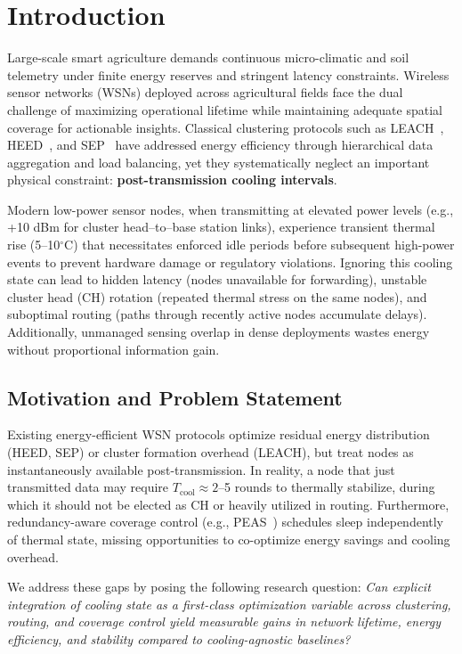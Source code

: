 \section{Introduction}
Large-scale smart agriculture demands continuous micro-climatic and soil telemetry under finite energy reserves and stringent latency constraints. Wireless sensor networks (WSNs) deployed across agricultural fields face the dual challenge of maximizing operational lifetime while maintaining adequate spatial coverage for actionable insights. Classical clustering protocols such as LEACH~\cite{heinzelman2000leach}, HEED~\cite{younis2004heed}, and SEP~\cite{smaragdakis2004sep} have addressed energy efficiency through hierarchical data aggregation and load balancing, yet they systematically neglect an important physical constraint: \textbf{post-transmission cooling intervals}.

Modern low-power sensor nodes, when transmitting at elevated power levels (e.g., +10 dBm for cluster head--to--base station links), experience transient thermal rise (5--10$^\circ$C) that necessitates enforced idle periods before subsequent high-power events to prevent hardware damage or regulatory violations. Ignoring this cooling state can lead to hidden latency (nodes unavailable for forwarding), unstable cluster head (CH) rotation (repeated thermal stress on the same nodes), and suboptimal routing (paths through recently active nodes accumulate delays). Additionally, unmanaged sensing overlap in dense deployments wastes energy without proportional information gain.

\subsection{Motivation and Problem Statement}

Existing energy-efficient WSN protocols optimize residual energy distribution (HEED, SEP) or cluster formation overhead (LEACH), but treat nodes as instantaneously available post-transmission. In reality, a node that just transmitted data may require $T_{\text{cool}} \approx 2$--5 rounds to thermally stabilize, during which it should not be elected as CH or heavily utilized in routing. Furthermore, redundancy-aware coverage control (e.g., PEAS~\cite{ye2003peas}) schedules sleep independently of thermal state, missing opportunities to co-optimize energy savings and cooling overhead.

We address these gaps by posing the following research question:  
\emph{Can explicit integration of cooling state as a first-class optimization variable across clustering, routing, and coverage control yield measurable gains in network lifetime, energy efficiency, and stability compared to cooling-agnostic baselines?}


